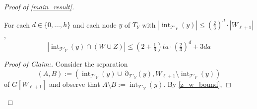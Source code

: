 \documentclass{patmorin}
\newenvironment{clmproof}{\begin{proof}[Proof of Claim:]\renewcommand{\qedsymbol}{\rule{1ex}{1ex}}}{\end{proof}}
\DeclareMathOperator{\interior}{int}
\DeclareMathOperator{\boundary}{\partial}
\begin{document}
\begin{proof}[Proof of \cref{main_result}]
  \begin{clm} \label{cell_bound}
     For each $d\in\{0,\ldots,h\}$ and 
     each node $y$ of $T_Y$ with $|\interior_{\mathcal{T}'_Y}(y)|\le (\tfrac{2}{3})^d\cdot |W_{\ell+1}|$,
     \begin{equation}
       |\interior_{\mathcal{T}'_Y}(y)\cap (W\cup Z)|  \le (2+\tfrac{1}{6})ta\cdot (\tfrac{2}{3})^{d}+3da \label{t_bound}
     \end{equation}
   \end{clm}


  \begin{clmproof}
  Consider the separation 
  \[  
    (A,B):=(\interior_{\mathcal{T}'_Y}(y)\cup\boundary_{\mathcal{T}'_Y}(y),W_{\ell+1}\setminus\interior_{\mathcal{T}'_Y}(y))
  \] 
  of $G[W_{\ell+1}]$ and observe that $A\setminus B:=\interior_{\mathcal{T}'_Y}(y)$.
  By \cref{z_w_bound},


\end{clmproof}
\end{proof}
\end{document}

